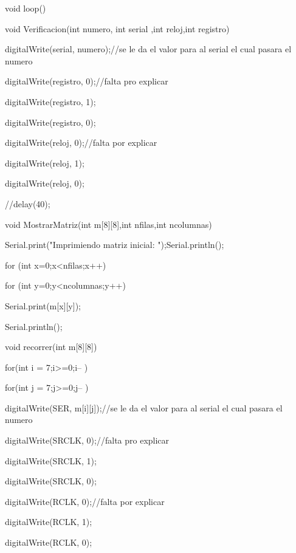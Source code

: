 \documentclass{article}
\begin{document}
void loop()
{   
  
}

void Verificacion(int numero, int serial ,int reloj,int registro)

{
  digitalWrite(serial, numero);//se le da el valor para al serial el cual pasara el numero 
  
  
  digitalWrite(registro, 0);//falta pro explicar
  
  digitalWrite(registro, 1);
  
  digitalWrite(registro, 0);
  
  digitalWrite(reloj, 0);//falta por explicar
  
  digitalWrite(reloj, 1);
  
  digitalWrite(reloj, 0);  
  
  //delay(40);
  
}

void MostrarMatriz(int m[8][8],int nfilas,int ncolumnas)
{

    Serial.print("Imprimiendo matriz inicial: ");Serial.println();
    
    for (int x=0;x<nfilas;x++)
    
    {
    
        for (int y=0;y<ncolumnas;y++)
        
        {
        
            Serial.print(m[x][y]);
        }
        
        Serial.println();
        
    }
    
}


void recorrer(int m[8][8])

{

  for(int i = 7;i>=0;i-- )
  
  {
  
    for(int j = 7;j>=0;j-- )
    
    {
    
      digitalWrite(SER, m[i][j]);//se le da el valor para al serial el cual pasara el numero 
  
      digitalWrite(SRCLK, 0);//falta pro explicar
      
      digitalWrite(SRCLK, 1);
      
      digitalWrite(SRCLK, 0);
      
      digitalWrite(RCLK, 0);//falta por explicar
      
      digitalWrite(RCLK, 1);
      
      digitalWrite(RCLK, 0);
      
    }
    
  }   
  
}
\end{document}
